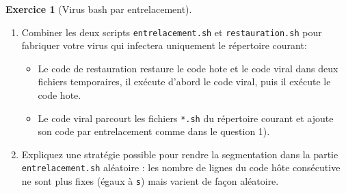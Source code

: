 \documentclass[a4paper,9pt]{article}
\theoremstyle{plain}
\theoremstyle{definition}
\newtheorem{exercice}{Exercice}
\begin{document}
\begin{exercice}[Virus bash par entrelacement]
\begin{enumerate}
\item Combiner les deux scripts \texttt{entrelacement.sh} et \texttt{restauration.sh} pour fabriquer votre virus qui infectera uniquement le répertoire courant:
  \begin{itemize}
  \item Le code de restauration restaure le code hote et le code viral dans deux fichiers temporaires, il exécute d'abord le code viral, puis il exécute le code hote.
  \item Le code viral parcourt les fichiers \verb|*.sh| du répertoire courant et ajoute son code par entrelacement comme dans le question 1).
    \end{itemize}
\item Expliquez une stratégie possible pour rendre la segmentation dans la partie \texttt{entrelacement.sh} aléatoire : les nombre de lignes du code hôte consécutive ne sont plus fixes (égaux à \verb|s|) mais varient de façon aléatoire.
\end{enumerate}
\end{exercice}
\end{document}
